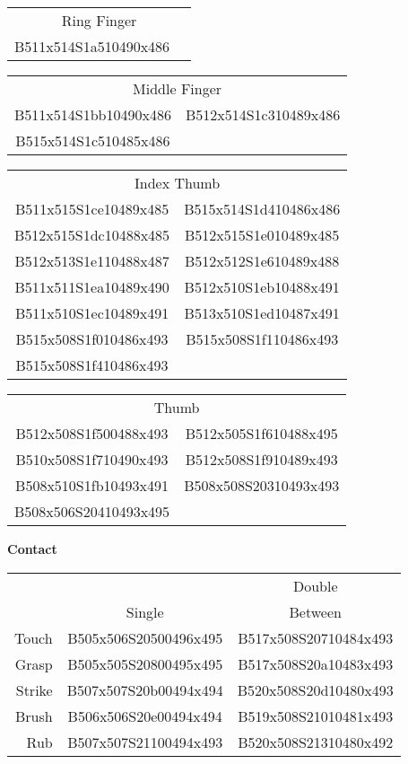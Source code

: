 \documentclass{article}
\begin{document}
\begin{multicols}{3}
\noindent
\begin{tabular}{cc}
\multicolumn{2}{c}{Ring Finger}\\
B511x514S1a510490x486\\
\end{tabular}

\noindent
\begin{tabular}{cc}
\multicolumn{2}{c}{Middle Finger}\\
B511x514S1bb10490x486&B512x514S1c310489x486\\
B515x514S1c510485x486\\
\end{tabular}

\noindent
\begin{tabular}{cc}
\multicolumn{2}{c}{Index Thumb}\\
B511x515S1ce10489x485&B515x514S1d410486x486\\
B512x515S1dc10488x485&B512x515S1e010489x485\\
B512x513S1e110488x487&B512x512S1e610489x488\\
B511x511S1ea10489x490&B512x510S1eb10488x491\\
B511x510S1ec10489x491&B513x510S1ed10487x491\\
B515x508S1f010486x493&B515x508S1f110486x493\\
B515x508S1f410486x493\\
\end{tabular}

\noindent
\begin{tabular}{cc}
\multicolumn{2}{c}{Thumb}\\
B512x508S1f500488x493&B512x505S1f610488x495\\
B510x508S1f710490x493&B512x508S1f910489x493\\
B508x510S1fb10493x491&B508x508S20310493x493\\
B508x506S20410493x495\\
\end{tabular}

\noindent
\textbf{Contact}

\noindent
\begin{tabular}{r@{}cc}
&&Double\\
&Single&Between\\
Touch &B505x506S20500496x495&B517x508S20710484x493\\
Grasp &B505x505S20800495x495&B517x508S20a10483x493\\
Strike&B507x507S20b00494x494&B520x508S20d10480x493\\
Brush &B506x506S20e00494x494&B519x508S21010481x493\\
Rub   &B507x507S21100494x493&B520x508S21310480x492\\
\end{tabular}


\end{multicols}
\end{document}
